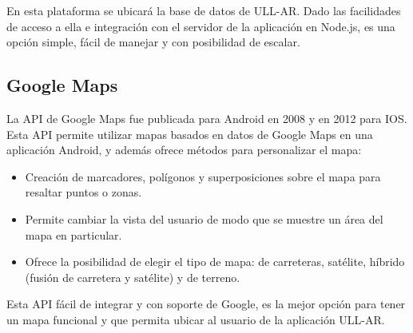 En esta plataforma se ubicará la base de datos de ULL-AR. Dado las facilidades de acceso a ella e integración con el servidor de la aplicación en Node.js, es una opción simple, fácil de manejar y con posibilidad de escalar.

\subsection{ Google Maps }

La API de Google Maps \cite{URL::GoogleMapsApi} fue publicada para Android en 2008 y en 2012 para IOS. Esta API permite utilizar mapas basados en datos de Google Maps en una aplicación Android, y además ofrece métodos para personalizar el mapa:
\begin{itemize}
    \item Creación de marcadores, polígonos y superposiciones sobre el mapa para resaltar puntos o zonas. 
    \item Permite cambiar la vista del usuario de modo que se muestre un área del mapa en particular. 
    \item Ofrece la posibilidad de elegir el tipo de mapa: de carreteras, satélite, híbrido (fusión de carretera y satélite) y de terreno.
\end{itemize}

Esta API fácil de integrar y con soporte de Google, es la mejor opción para tener un mapa funcional y que permita ubicar al usuario de la aplicación ULL-AR.
